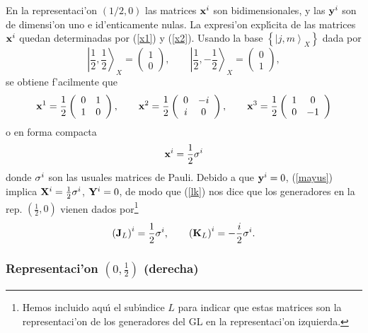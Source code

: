 En la representaci'on $({1}/{2},0)$ las matrices ${\bf x}^{i}$ son
bidimensionales, y las ${\bf y}^{i}$ son de dimensi'on uno e
id'enticamente nulas. La expresi'on expl{\'\i}cita de las matrices $%
{\bf x}^{i}$ quedan determinadas por (\ref{x1}) y (\ref{x2}). Usando la base 
$\left\{ \left| j,m\right\rangle _{X}\right\} $ dada por 
\begin{equation}
\left| \frac{1}{2},\frac{1}{2}\right\rangle _{X}=\left( 
\begin{array}{c}
1 \\ 
0
\end{array}
\right) ,\qquad \left| \frac{1}{2},-\frac{1}{2}\right\rangle _{X}=\left( 
\begin{array}{c}
0 \\ 
1
\end{array}
\right) , 
\end{equation}
se obtiene f'acilmente que 
\begin{equation}
{\bf x}^1=\frac{1}{2}\left( 
\begin{array}{cc}
0 & 1 \\ 
1 & 0
\end{array}
\right) ,\qquad {\bf x}^2=\frac{1}{2}\left( 
\begin{array}{cc}
0 & -i \\ 
i & 0
\end{array}
\right) ,\qquad {\bf x}^3=\frac{1}{2}\left( 
\begin{array}{cc}
1 & 0 \\ 
0 & -1
\end{array}
\right) 
\end{equation}
o en forma compacta 
\begin{equation}
{\bf x}^{i}=\frac{1}{2}{\bf \sigma }^{i} 
\end{equation}
donde ${\bf \sigma }^{i}$ son las usuales matrices de Pauli. Debido a que $%
{\bf y}^{i}=0$, (\ref{mayus}) implica ${\bf X}^{i}=\frac{1}{2}{\bf \sigma }%
^{i}$, ${\bf Y}^{i}=0$, de modo que (\ref{lk}) nos dice que los generadores
en la rep. $(\frac{1}{2},0)$ vienen dados por\footnote{%
Hemos incluido aqu{\'\i} el sub{\'\i}ndice $L$ para indicar que estas
matrices son la representaci'on de los generadores del GL en la
representaci'on izquierda.} 
\begin{equation}
({\bf J}_{L}{\bf )}^{i}=\frac{1}{2}{\bf \sigma }^{i},\qquad ({\bf K}_{L}{\bf %
)}^{i}=-\frac{i}{2}{\bf \sigma }^{i}. 
\end{equation}

\subsubsection{Representaci'on $(0,\frac{1}{2})$ (derecha)\label{right}}

